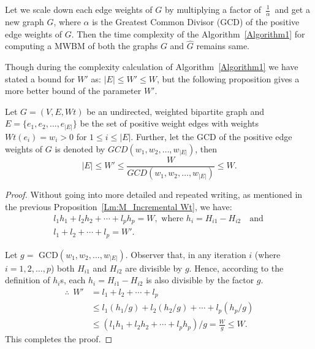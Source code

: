 \documentclass[runningheads,a4paper]{llncs}
\begin{document}
\begin{remark}
Let we scale down each edge weights of 
$G$ by multiplying a factor of \,$\frac{1}{\alpha}$\, and get a new graph $\widehat{G}$, where $\alpha$ is the Greatest Common Divisor (GCD) of the positive edge weights of $G$. Then the time complexity of the Algorithm~\ref{Algorithm1} for computing a MWBM of both the graphs $G$ and $\widehat{G}$ remains same.
\end{remark}


Though during the complexity calculation of Algorithm~\ref{Algorithm1} we have stated a bound for $W'$ as: $|E| \leq W' \leq W$, but the following proposition gives a more better bound of the parameter $W'$.
\begin{proposition}
\label{GCD_Property}
Let $G = (V, E, \textit{Wt})$ be an undirected, weighted bipartite graph and $E=\{e_1,e_2,\ldots,e_{|E|}\}$ be the set of positive weight edges with weights $\textit{Wt}(e_i)=w_i >0$ for $1 \leq i \leq |E|$. 
Further, let the GCD of the positive edge weights of $G$ is denoted by $ \textit{GCD}(w_1,w_2,\ldots,w_{|E|})$,
then
$$|E| \leq W' \leq \frac{W}{ \textit{GCD}(w_1,w_2,\ldots,w_{|E|})} \leq W.$$
\end{proposition} 
\begin{proof}
Without going into more detailed and repeated writing, as mentioned in the previous Proposition~\ref{Lm:M_Incremental Wt}, we have:  
\begin{align*}
& l_1h_1+l_2h_2+ \cdots + l_ph_p=W, \text{~where~} h_i=H_{i1}-H_{i2} 
\quad\text{and}\quad \\
& l_1+l_2+ \cdots + l_p=W'.
\end{align*}


Let $g=$ GCD$(w_1,w_2,\ldots,w_{|E|})$. 
Observer that, in any iteration $i$ (where $i=1,2,\ldots,p$) both $H_{i1}$ and $H_{i2}$ are divisible by $g$. Hence, according to the definition of $h_i$s,  each $h_i=H_{i1}-H_{i2} $ is also divisible by the factor $g$.
\begin{align*}
\therefore~~W' 
& =    l_1+l_2+ \cdots + l_p  \\
& \leq l_1(h_1/g)+l_2(h_2/g)+ \cdots + l_p(h_p/g) \\
& \leq (l_1h_1+l_2h_2+ \cdots + l_ph_p)/g = \frac{W}{g} \leq W.\end{align*}
This completes the proof.
\end{proof}
\end{document}
